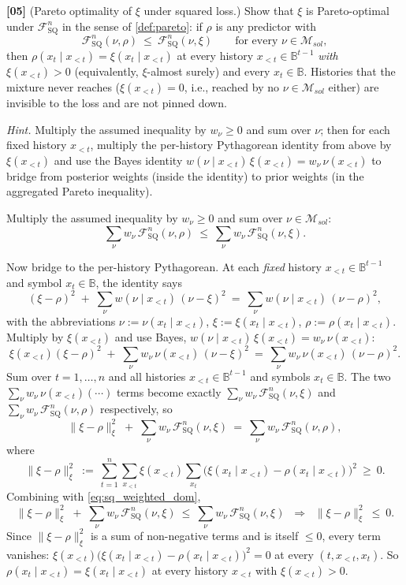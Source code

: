 \documentclass[fontsize=11pt, parskip=half]{scrartcl}
\theoremstyle{definition}
\newenvironment{solution}{%
    \begin{tcolorbox}[colback=black!5!white, colframe=black!50!white,
      title={\textbf{Solution}}, fonttitle=\normalfont, breakable]
  }{\end{tcolorbox}}
\newenvironment{solution}{\expandafter\comment}{\expandafter\endcomment}
\newcommand{\Msol}{\mathcal{M}_{sol}}
\newcommand{\FSQ}{\mathcal{F}_{\text{SQ}}}
\begin{document}
\bigskip

\noindent
\textbf{[05]} (Pareto optimality of $\xi$ under squared loss.) Show that $\xi$
is Pareto-optimal under $\FSQ^n$ in the sense of \cref{def:pareto}: if $\rho$
is any predictor with
\[
  \FSQ^n(\nu, \rho) ~\leq~ \FSQ^n(\nu, \xi) \qquad \text{for every } \nu \in \Msol,
\]
then $\rho(x_t \mid x_{<t}) = \xi(x_t \mid x_{<t})$ at every history $x_{<t} \in
\mathbb{B}^{t-1}$ \emph{with $\xi(x_{<t}) > 0$} (equivalently, $\xi$-almost
surely) and every $x_t \in \mathbb{B}$. Histories that the mixture never reaches
($\xi(x_{<t}) = 0$, i.e., reached by no $\nu \in \Msol$ either) are invisible
to the loss and are not pinned down.

\textit{Hint.} Multiply the assumed inequality by $w_\nu \geq 0$ and sum over
$\nu$; then for each fixed history $x_{<t}$, multiply the per-history
Pythagorean identity from above by $\xi(x_{<t})$ and use the Bayes identity
$w(\nu \mid x_{<t})\,\xi(x_{<t}) = w_\nu \,\nu(x_{<t})$ to bridge from posterior
weights (inside the identity) to prior weights (in the aggregated Pareto
inequality).

\begin{solution}
Multiply the assumed inequality by $w_\nu \geq 0$ and sum over $\nu \in \Msol$:
\begin{equation}\label{eq:sq_weighted_dom}
  \sum_\nu w_\nu\,\FSQ^n(\nu, \rho)
  ~\leq~
  \sum_\nu w_\nu\,\FSQ^n(\nu, \xi).
\end{equation}

Now bridge to the per-history Pythagorean. At each \emph{fixed} history $x_{<t}
\in \mathbb{B}^{t-1}$ and symbol $x_t \in \mathbb{B}$, the identity says
\[
  (\xi - \rho)^2 \;+\; \sum_\nu w(\nu \mid x_{<t})\,(\nu - \xi)^2
  ~=~ \sum_\nu w(\nu \mid x_{<t})\,(\nu - \rho)^2,
\]
with the abbreviations $\nu := \nu(x_t \mid x_{<t})$, $\xi := \xi(x_t \mid x_{<t})$,
$\rho := \rho(x_t \mid x_{<t})$. Multiply by $\xi(x_{<t})$ and use Bayes,
$w(\nu \mid x_{<t})\,\xi(x_{<t}) = w_\nu \,\nu(x_{<t})$:
\[
  \xi(x_{<t})(\xi - \rho)^2
  \;+\; \sum_\nu w_\nu \,\nu(x_{<t})\,(\nu - \xi)^2
  ~=~ \sum_\nu w_\nu \,\nu(x_{<t})\,(\nu - \rho)^2.
\]
Sum over $t = 1, \dots, n$ and all histories $x_{<t} \in \mathbb{B}^{t-1}$ and
symbols $x_t \in \mathbb{B}$. The two $\sum_\nu w_\nu \,\nu(x_{<t})(\cdots)$
terms become exactly $\sum_\nu w_\nu \,\FSQ^n(\nu, \xi)$ and $\sum_\nu w_\nu \,
\FSQ^n(\nu, \rho)$ respectively, so
\[
  \|\xi - \rho\|_\xi^2
  \;+\; \sum_\nu w_\nu\,\FSQ^n(\nu, \xi)
  ~=~
  \sum_\nu w_\nu\,\FSQ^n(\nu, \rho),
\]
where
\[
  \|\xi - \rho\|_\xi^2 ~:=~
  \sum_{t=1}^n \sum_{x_{<t}} \xi(x_{<t}) \sum_{x_t}
    \bigl(\xi(x_t \mid x_{<t}) - \rho(x_t \mid x_{<t})\bigr)^2 ~\geq~ 0.
\]
Combining with \cref{eq:sq_weighted_dom},
\[
  \|\xi - \rho\|_\xi^2 \;+\; \sum_\nu w_\nu\,\FSQ^n(\nu, \xi)
  ~\leq~ \sum_\nu w_\nu\,\FSQ^n(\nu, \xi)
  \;\;\Longrightarrow\;\;
  \|\xi - \rho\|_\xi^2 ~\leq~ 0.
\]
Since $\|\xi - \rho\|_\xi^2$ is a sum of non-negative terms and is itself
$\leq 0$, every term vanishes:
$\xi(x_{<t})\bigl(\xi(x_t \mid x_{<t}) - \rho(x_t \mid x_{<t})\bigr)^2 = 0$
at every $(t, x_{<t}, x_t)$. So $\rho(x_t \mid x_{<t}) = \xi(x_t \mid x_{<t})$
at every history $x_{<t}$ with $\xi(x_{<t}) > 0$. \qedhere
\end{solution}
\end{document}

